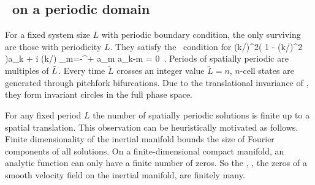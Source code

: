 \subsection{\KSe\ on a periodic domain}
For a fixed system size 
$L$ with periodic boundary condition, the only surviving {\eqva}  are
those with periodicity $L$.
They satisfy 
the \eqv\ condition for 
\beq
(k/)^2\left( 1 - (k/)^2  \right)a_k 
     + i (k/) \sum_{m=-\infty}^{+\infty} a_m a_{k-m} = 0
\,.
\label{eq:stfks}
\eeq 
Periods of spatially periodic {\eqva} are multiples of $\tilde{L}$.
Every time $\tilde{L}$ crosses an integer value  $\tilde{L}=n$,
$n$-cell states
are generated through pitchfork bifurcations. 
Due to the translational invariance of {\KSe},
they form invariant circles
in the full phase space.

For any fixed period $L$
the number 
of spatially periodic solutions is finite up to a spatial translation.
This observation can be heuristically motivated as follows. 
Finite dimensionality of the inertial manifold
bounds the size of Fourier components of all solutions.
On a finite-dimensional compact manifold,
an analytic function can only have a finite number
of zeros. So the {\eqva}, {\ie},
the zeros of a smooth velocity field on
the inertial manifold, are finitely many.

